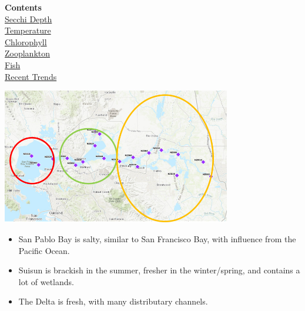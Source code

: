 \documentclass[]{article}\usepackage[]{graphicx}\usepackage[]{color}
\begin{document}
\begin{Row}
  \begin{Cell}{2}
    \begin{center}
      {\bf {\Large Contents}} \\ \vspace{7pt}
      \hyperlink{page:secchi}{{\Large Secchi Depth}} \\ \vspace{7pt}
      \hyperlink{page:temperature}{{\Large Temperature}} \\ \vspace{7pt}
      \hyperlink{page:chlorophyll}{{\Large Chlorophyll}} \\ \vspace{7pt}
      \hyperlink{page:zooplankton}{{\Large Zooplankton}} \\ \vspace{7pt}
      \hyperlink{page:fish}{{\Large Fish}} \\ \vspace{7pt}
      \hyperlink{page:recenttrends}{{\Large Recent Trends}} \\ \vspace{7pt}
    \end{center}
  \end{Cell}
  \begin{Cell}{5}
    \begin{center}
      \includegraphics[width=10cm,trim=0 0 0 0,clip,align=m]{figures/region_map_2.png}
      \vspace{10pt}
      {\large 
        \begin{itemize}[leftmargin=1cm,rightmargin=1cm]
          \item San Pablo Bay is salty, similar to San Francisco Bay, with influence from 
          the Pacific Ocean.
          \item Suisun is brackish in the summer, fresher in the winter/spring, and 
          contains a lot of wetlands.
          \item The Delta is fresh, with many distributary channels.

\end{itemize}}
\end{center}
\end{Cell}
\end{Row}
\end{document}
